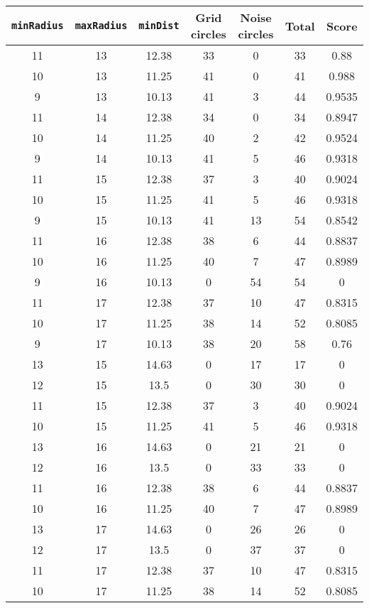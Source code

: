 \documentclass[letterpaper, 12pt]{article}
\begin{document}
\begin{longtable}{|c|c|c|c|c|c|c|}
\hline
\textbf{\texttt{minRadius}} & \textbf{\texttt{maxRadius}} & \textbf{\texttt{minDist}} & \textbf{Grid circles} & \textbf{Noise circles} & \textbf{Total} & \textbf{Score} \\
\hline
11 & 13 & 12.38 & 33 & 0 & 33 & 0.88 \\
\hline
10 & 13 & 11.25 & 41 & 0 & 41 & 0.988 \\
\hline
9 & 13 & 10.13 & 41 & 3 & 44 & 0.9535 \\
\hline
11 & 14 & 12.38 & 34 & 0 & 34 & 0.8947 \\
\hline
10 & 14 & 11.25 & 40 & 2 & 42 & 0.9524 \\
\hline
9 & 14 & 10.13 & 41 & 5 & 46 & 0.9318 \\
\hline
11 & 15 & 12.38 & 37 & 3 & 40 & 0.9024 \\
\hline
10 & 15 & 11.25 & 41 & 5 & 46 & 0.9318 \\
\hline
9 & 15 & 10.13 & 41 & 13 & 54 & 0.8542 \\
\hline
11 & 16 & 12.38 & 38 & 6 & 44 & 0.8837 \\
\hline
10 & 16 & 11.25 & 40 & 7 & 47 & 0.8989 \\
\hline
9 & 16 & 10.13 & 0 & 54 & 54 & 0 \\
\hline
11 & 17 & 12.38 & 37 & 10 & 47 & 0.8315 \\
\hline
10 & 17 & 11.25 & 38 & 14 & 52 & 0.8085 \\
\hline
9 & 17 & 10.13 & 38 & 20 & 58 & 0.76 \\
\hline
13 & 15 & 14.63 & 0 & 17 & 17 & 0 \\
\hline
12 & 15 & 13.5 & 0 & 30 & 30 & 0 \\
\hline
11 & 15 & 12.38 & 37 & 3 & 40 & 0.9024 \\
\hline
10 & 15 & 11.25 & 41 & 5 & 46 & 0.9318 \\
\hline
13 & 16 & 14.63 & 0 & 21 & 21 & 0 \\
\hline
12 & 16 & 13.5 & 0 & 33 & 33 & 0 \\
\hline
11 & 16 & 12.38 & 38 & 6 & 44 & 0.8837 \\
\hline
10 & 16 & 11.25 & 40 & 7 & 47 & 0.8989 \\
\hline
13 & 17 & 14.63 & 0 & 26 & 26 & 0 \\
\hline
12 & 17 & 13.5 & 0 & 37 & 37 & 0 \\
\hline
11 & 17 & 12.38 & 37 & 10 & 47 & 0.8315 \\
\hline
10 & 17 & 11.25 & 38 & 14 & 52 & 0.8085 \\

\end{longtable}
\end{document}
